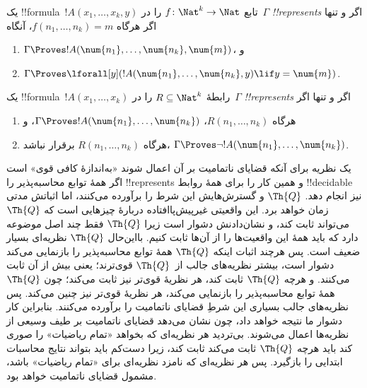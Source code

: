 \documentclass[../../../include/open-logic-section]{subfiles}
\begin{document}
\begin{defn}
یک !!{formula}~$!A(x_1,\dots,x_k,y)$ تابع
$f\colon\Nat^k\to\Nat$ را در~$\Gamma$ \emph{!!{represents}} اگر
و تنها اگر هرگاه $f(n_1,\dots,n_k)=m$، آنگاه
\begin{enumerate}
\item $\Gamma \Proves !A(\num{n_1}, \dots, \num{n_k}, \num{m})$، و
\item $\Gamma \Proves \lforall[y](!A(\num{n_1}, \dots, \num{n_k},
y) \lif y = \num{m})$.
\end{enumerate}
\end{defn}

\begin{defn}
یک !!{formula}~$!A(x_1,\dots,x_k)$ رابطهٔ
$R\subseteq\Nat^k$ را در~$\Gamma$ \emph{!!{represents}} اگر و
تنها اگر
\begin{enumerate}
\item هرگاه $R(n_1,\dots,n_k)$،
$\Gamma\Proves !A(\num{n_1},\dots,\num{n_k})$، و
\item هرگاه $R(n_1,\dots,n_k)$ برقرار نباشد،
$\Gamma\Proves\lnot !A(\num{n_1},\dots,\num{n_k})$.
\end{enumerate}
\end{defn}

یک نظریه برای آنکه قضایای ناتمامیت بر آن اعمال شوند «به‌اندازهٔ کافی
قوی» است اگر همهٔ توابع محاسبه‌پذیر را !!{represents} و همین کار
را برای همهٔ روابط !!{decidable} نیز انجام دهد. $\Th{Q}$ و گسترش‌هایش این شرط را برآورده می‌کنند،
اما اثباتش مدتی زمان خواهد برد. این واقعیتی غیرپیش‌پاافتاده دربارهٔ
چیزهایی است که $\Th{Q}$ می‌تواند ثابت کند، و نشان‌دادنش دشوار است
زیرا $\Th{Q}$ فقط چند اصل موضوعه دارد که باید همهٔ این واقعیت‌ها را
از آن‌ها ثابت کنیم. بااین‌حال $\Th{Q}$ نظریه‌ای بسیار ضعیف است. پس
هرچند اثبات اینکه $\Th{Q}$ همهٔ توابع محاسبه‌پذیر را بازنمایی می‌کند
دشوار است، بیشتر نظریه‌های جالب از~$\Th{Q}$ قوی‌ترند؛ یعنی بیش از آن
ثابت می‌کنند. و هرچه $\Th{Q}$ ثابت کند، هر نظریهٔ قوی‌تر نیز ثابت
می‌کند؛ چون $\Th{Q}$ همهٔ توابع محاسبه‌پذیر را بازنمایی می‌کند، هر
نظریهٔ قوی‌تر نیز چنین می‌کند. پس نظریه‌های جالب بسیاری این شرطِ
قضایای ناتمامیت را برآورده می‌کنند. بنابراین کار دشوار ما نتیجه خواهد
داد، چون نشان می‌دهد قضایای ناتمامیت بر طیف وسیعی از نظریه‌ها اعمال
می‌شوند. بی‌تردید هر نظریه‌ای که بخواهد «تمام ریاضیات» را صوری کند
باید هرچه $\Th{Q}$ ثابت می‌کند ثابت کند، زیرا دست‌کم باید بتواند
نتایج محاسبات ابتدایی را بازگیرد. پس هر نظریه‌ای که نامزد نظریه‌ای
برای «تمام ریاضیات» باشد، مشمول قضایای ناتمامیت خواهد بود.
\end{document}
